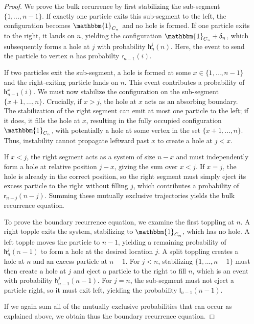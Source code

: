 \documentclass[11pt]{article}
\newcommand{\one}{\mathbbm{1}}
\newcommand{\sgrleft}[2]{\mathsf{l}_{#1}(#2)}
\newcommand{\sgrright}[2]{\mathsf{r}_{#1}(#2)}
\begin{document}
\begin{proof}
    We prove the bulk recurrence by first stabilizing the sub-segment $\{1, \dots, n-1\}$.
    If exactly one particle exits this sub-segment to the left, the configuration becomes $\one_{C_n}$ and no hole is formed. If one particle exits to the right, it lands on $n$, yielding the configuration $\one_{C_n} + \delta_n$, which subsequently forms a hole at $j$ with probability $\mathsf{h}_n^j(n)$. Here, the event to send the particle to vertex $n$ has probabilty $\sgrright{n-1}{i}.$
    
    If two particles exit the sub-segment, a hole is formed at some $x \in \{1, \dots, n-1\}$ and the right-exiting particle lands on $n$. This event contributes a probability of $\mathsf{h}_{n-1}^x(i)$. We must now stabilize the configuration on the sub-segment $\{x+1, \dots, n\}$. 
    Crucially, if $x > j$, the hole at $x$ acts as an absorbing boundary. The stabilization of the right segment can emit at most one particle to the left; if it does, it fills the hole at $x$, resulting in the fully occupied configuration $\one_{C_n}$, with potentially a hole at some vertex in the set $\{x+1,\dots, n\}$. Thus, instability cannot propagate leftward past $x$ to create a hole at $j < x$.
    
    If $x < j$, the right segment acts as a system of size $n-x$ and must independently form a hole at relative position $j-x$, giving the sum over $x < j$. If $x = j$, the hole is already in the correct position, so the right segment must simply eject its excess particle to the right without filling $j$, which contributes a probability of $\sgrright{n-j}{n-j}$. Summing these mutually exclusive trajectories yields the bulk recurrence equation.
    
    To prove the boundary recurrence equation, we examine the first toppling at $n$. A right topple exits the system, stabilizing to $\one_{C_n}$, which has no hole. A left topple moves the particle to $n-1$, yielding a remaining probability of $\mathsf{h}_n^j(n-1)$ to form a hole at the desired location $j$. A split toppling creates a hole at $n$ and an excess particle at $n-1$. For $j < n$, stabilizing $\{1, \dots, n-1\}$ must then create a hole at $j$ and eject a particle to the right to fill $n$, which is an event with probability $\mathsf{h}_{n-1}^j(n-1)$. For $j=n$, the sub-segment must not eject a particle right, so it must exit left, yielding the probability $\sgrleft{n-1}{n-1}$.

    If we again sum all of the mutually exclusive probabilities that can occur as explained above, we obtain thus the boundary recurrence equation.
\end{proof}
\end{document}
